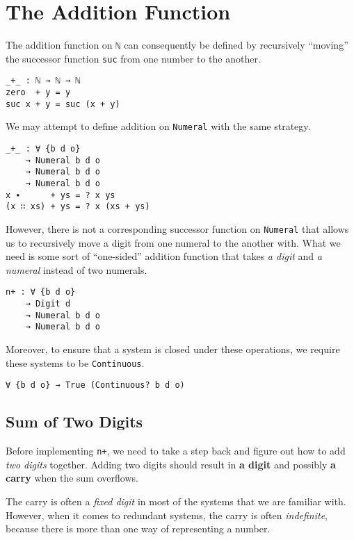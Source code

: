 \documentclass[\main/thesis.tex]{subfiles}
\begin{document}
\section{The Addition Function}\label{addition}

The addition function on \lstinline|ℕ| can consequently be defined by
recursively ``moving'' the successor function \lstinline|suc| from one number
to the another.

\begin{lstlisting}
_+_ : ℕ → ℕ → ℕ
zero  + y = y
suc x + y = suc (x + y)
\end{lstlisting}

We may attempt to define addition on \lstinline|Numeral| with the same strategy.

\begin{lstlisting}
_+_ : ∀ {b d o}
    → Numeral b d o
    → Numeral b d o
    → Numeral b d o
x ∙      + ys = ? x ys
(x ∷ xs) + ys = ? x (xs + ys)
\end{lstlisting}

However, there is not a corresponding successor function on \lstinline|Numeral|
that allows us to recursively move a digit from one numeral to the another with.
What we need is some sort of ``one-sided'' addition function that takes
\textit{a digit} and \textit{a numeral} instead of two numerals.

\begin{lstlisting}
n+ : ∀ {b d o}
    → Digit d
    → Numeral b d o
    → Numeral b d o
\end{lstlisting}

Moreover, to ensure that a system is closed under these operations,
we require these systems to be \lstinline|Continuous|.

\begin{lstlisting}
∀ {b d o} → True (Continuous? b d o)
\end{lstlisting}

\subsection{Sum of Two Digits}

Before implementing \lstinline|n+|, we need to take a step back and figure out
how to add \textit{two digits} together.
Adding two digits should result in \textbf{a digit} and
possibly \textbf{a carry} when the sum overflows.

The carry is often a \textit{fixed digit} in most of the systems that we are
familiar with.
However, when it comes to redundant systems,
the carry is often \textit{indefinite},
because there is more than one way of representing a number.
\end{document}
